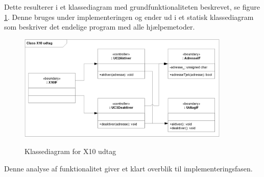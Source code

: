 Dette resulterer i et klassediagram med grundfunktionaliteten beskrevet, se figure \ref{fig:X10_udtag_class}. Denne bruges under implementeringen og ender ud i et statisk klassediagram som beskriver det endelige program med alle hjælpemetoder.

\begin{figure}[!htb]
     \centering
     { \includegraphics[width=0.9\textwidth]{Billeder/UML/X10_modtager_Class}}
     \caption{Klassediagram for X10 udtag}
     \label{fig:X10_udtag_class}
\end{figure}

Denne analyse af funktionalitet giver et klart overblik til implementeringsfasen.